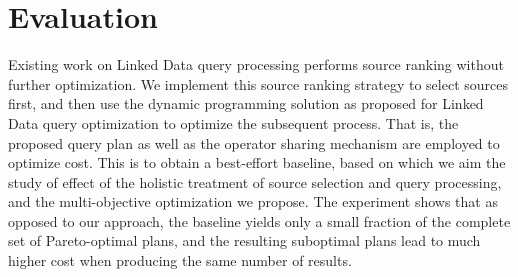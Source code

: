 \section{Evaluation}
\label{sec:eva}
Existing work on Linked Data query processing performs source ranking without further optimization. We implement this source ranking strategy to select sources first, and then use the dynamic programming solution as proposed for Linked Data query optimization to optimize the subsequent process. That is, the proposed query plan as well as the operator sharing mechanism are employed to optimize cost. This is to obtain a best-effort baseline, based on which we aim the study of effect of the holistic treatment of source selection and query processing, and the multi-objective optimization we propose. The experiment shows that as opposed to our approach, the baseline yields only a small fraction of the complete set of Pareto-optimal plans, and the resulting suboptimal plans lead to much higher cost when producing the same number of results. 










